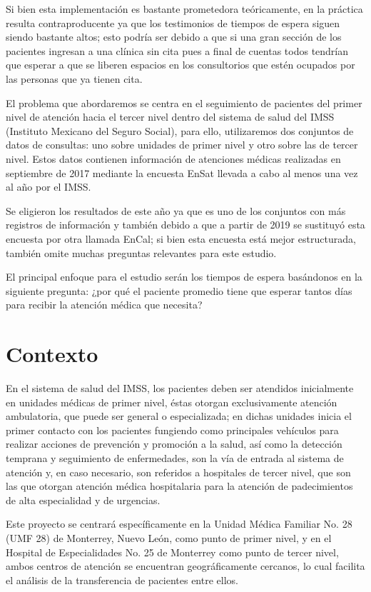 \documentclass[10pt]{article}
\begin{document}
    Si bien esta implementación es bastante prometedora teóricamente, en la práctica resulta contraproducente ya que los testimonios de tiempos de espera siguen siendo bastante altos; esto podría ser debido a que si una gran sección de los pacientes ingresan a una clínica sin cita pues a final de cuentas todos tendrían que esperar a que se liberen espacios en los consultorios que estén ocupados por las personas que ya tienen cita.
    
    El problema que abordaremos se centra en el seguimiento de pacientes del primer nivel de atención hacia el tercer nivel dentro del sistema de salud del IMSS (Instituto Mexicano del Seguro Social), para ello, utilizaremos dos conjuntos de datos de consultas: uno sobre unidades de primer nivel y otro sobre las de tercer nivel. Estos datos contienen información de atenciones médicas realizadas en septiembre de 2017 mediante la encuesta EnSat \cite{ensat2017} llevada a cabo al menos una vez al año por el IMSS.
    
    Se eligieron los resultados de este año ya que es uno de los conjuntos con más registros de información y también debido a que a partir de 2019 se sustituyó esta encuesta por otra llamada EnCal; si bien esta encuesta está mejor estructurada, también omite muchas preguntas relevantes para este estudio.
    
    El principal enfoque para el estudio serán los tiempos de espera basándonos en la siguiente pregunta: ¿por qué el paciente promedio tiene que esperar tantos días para recibir la atención médica que necesita?

	\section{Contexto}
	En el sistema de salud del IMSS, los pacientes deben ser atendidos inicialmente en unidades médicas de primer nivel, éstas otorgan exclusivamente atención ambulatoria, que puede ser general o especializada; en dichas unidades inicia el primer contacto con los pacientes fungiendo como principales vehículos para realizar acciones de prevención y promoción a la salud, así como la detección temprana y seguimiento de enfermedades, son la vía de entrada al sistema de atención y, en caso necesario, son referidos a hospitales de tercer nivel, que son las que otorgan atención médica hospitalaria para la atención de padecimientos de alta especialidad y de urgencias.
	
    Este proyecto se centrará específicamente en la Unidad Médica Familiar No. 28 (UMF 28) de Monterrey, Nuevo León, como punto de primer nivel, y en el Hospital de Especialidades No. 25 de Monterrey como punto de tercer nivel, ambos centros de atención se encuentran geográficamente cercanos, lo cual facilita el análisis de la transferencia de pacientes entre ellos.
    
\end{document}

